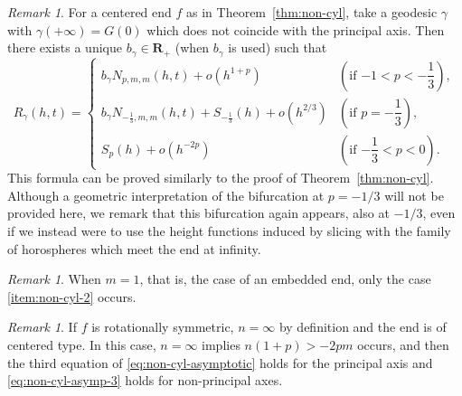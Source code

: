 \documentclass[a4paper]{amsart}
\theoremstyle{plain}
\theoremstyle{remark}
\newtheorem{remark}[theorem]{Remark}
\numberwithin{equation}{section}
\begin{document}
\begin{remark}\label{rem:non-principal}
 For a centered end $f$ as in Theorem~\ref{thm:non-cyl},
 take a geodesic $\gamma$ with $\gamma(+\infty)=G(0)$
 which does not coincide with the principal axis.
 Then there exists a unique $b_{\gamma}\in{\boldsymbol{R}}_+$
	{\rm (}when $b_{\gamma}$ is used{\rm)}
	such that 
	\begin{equation}\label{eq:non-cyl-asymp-3}
	 R_{\gamma}(h,t)=
	  \begin{cases}
	   b_{\gamma}N_{p,m,m}(h,t) +o(h^{1+p})\qquad & 
	   \left(\text{if $-1<p<-\dfrac{1}{3}$}\right),\\[6pt]
	   b_{\gamma}N_{-\frac{1}{3},m,m}(h,t)
	   +S_{-\frac{1}{3}}(h)+o(h^{2/3}) &
	   \left(\text{if $p=-\dfrac{1}{3}$}\right),\\[6pt]
	   S_p(h) +o(h^{-2p}) &
	   \left(\text{if $-\dfrac{1}{3}<p<0$}\right).
	  \end{cases}
	\end{equation}
 This formula
 can be proved similarly to the proof of 
 Theorem~\ref{thm:non-cyl}. 
 Although a geometric interpretation of the bifurcation at $p=-1/3$
 will not be provided here,
 we remark that this bifurcation again appears, also at $-1/3$, even
 if we instead were to use the height functions induced by slicing with
 the family of horospheres which meet the end at infinity.
\end{remark}
\begin{remark}
 When $m=1$, that is, the case of an embedded end,
 only the case \ref{item:non-cyl-2} occurs.
\end{remark}
 
\begin{remark}
 If $f$ is rotationally symmetric, $n=\infty$ by definition
 and the end is of centered type.
 In this case, $n=\infty$ implies $n(1+p)>-2pm$ occurs, and then
 the third equation of \eqref{eq:non-cyl-asymptotic} holds
 for the principal axis
 and \eqref{eq:non-cyl-asymp-3} holds for non-principal axes.
\end{remark}
\end{document}
